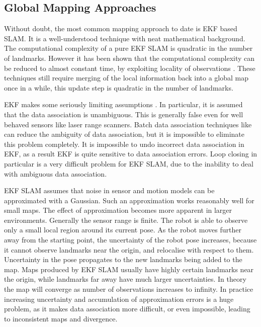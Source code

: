 \subsection{Global Mapping Approaches}


Without doubt, the most common mapping approach to date is EKF based
SLAM. It is a well-understood technique with neat mathematical
background. The computational complexity of a pure EKF SLAM is
quadratic in the number of landmarks. However it has been shown that
the computational complexity can be reduced to almost constant time,
by exploiting locality of observations \cite{Thrun03d,guivant04}.
These techniques still require merging of the local information back
into a global map once in a while, this update step is quadratic in
the number of landmarks.

EKF makes some seriously limiting assumptions \cite{fixme}. In
particular, it is assumed that the data association is
unambiguous. This is generally false even for well behaved sensors
like laser range scanners. Batch data association techniques like
\cite{neira01:_data_assoc_stoch_mappin_using,
tardos02:_mappin_local_indoor_envir_using_sonar_data} can reduce the
ambiguity of data association, but it is impossible to eliminate this
problem completely. It is impossible to undo incorrect data
association in EKF, as a result EKF is quite sensitive to data
association errors. Loop closing in particular is a very difficult
problem for EKF SLAM, due to the inability to deal with ambiguous data
association.

EKF SLAM assumes that noise in sensor and motion models can be
approximated with a Gaussian. Such an approximation works reasonably
well for small maps. The effect of approximation becomes more apparent
in larger environments. Generally the sensor range is finite. The
robot is able to observe only a small local region around its current
pose. As the robot moves further away from the starting point, the
uncertainty of the robot pose increases, because it cannot observe
landmarks near the origin, and relocalise with respect to
them. Uncertainty in the pose propagates to the new landmarks being
added to the map. Maps produced by EKF SLAM usually have highly
certain landmarks near the origin, while landmarks far away have much
larger uncertainties. In theory the map will converge as number of
observations increases to infinity.  In practice increasing uncertainty and accumulation of
approximation errors is a huge problem, as it makes data association
more difficult, or even impossible, leading to inconsistent maps and
divergence.



